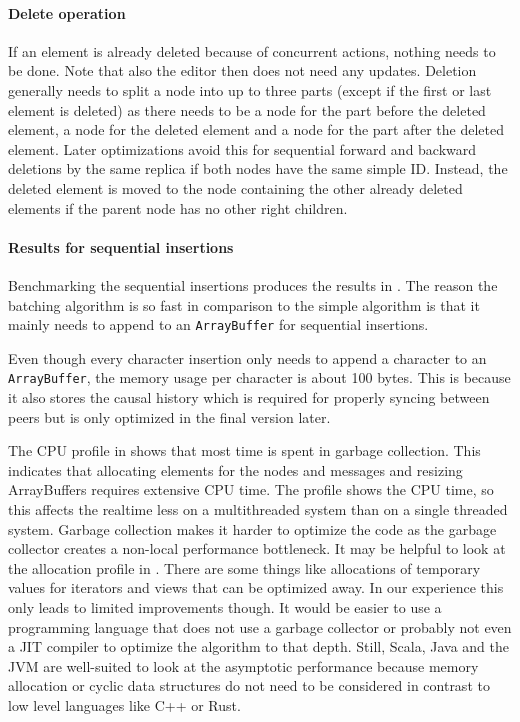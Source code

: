 \paragraph{Delete operation}

If an element is already deleted because of concurrent actions, nothing needs to be done. Note that also the editor then does not need any updates. Deletion generally needs to split a node into up to three parts (except if the first or last element is deleted) as there needs to be a node for the part before the deleted element, a node for the deleted element and a node for the part after the deleted element. Later optimizations avoid this for sequential forward and backward deletions by the same replica if both nodes have the same \gls{simple ID}. Instead, the deleted element is moved to the node containing the other already deleted elements if the parent node has no other right children.


\paragraph{Results for sequential insertions}

Benchmarking the sequential insertions produces the results in . The reason the \gls{batching algorithm} is so fast in comparison to the \gls{simple algorithm} is that it mainly needs to append to an \texttt{ArrayBuffer} for sequential insertions.

Even though every character insertion only needs to append a character to an \texttt{ArrayBuffer}, the memory usage per character is about 100 bytes. This is because it also stores the causal history which is required for properly syncing between peers but is only optimized in the final version later.

The CPU profile in  shows that most time is spent in garbage collection. This indicates that allocating elements for the nodes and messages and resizing ArrayBuffers requires extensive CPU time. The profile shows the CPU time, so this affects the realtime less on a multithreaded system than on a single threaded system. Garbage collection makes it harder to optimize the code as the garbage collector creates a non-local performance bottleneck. It may be helpful to look at the allocation profile in .
There are some things like allocations of temporary values for iterators and views that can be optimized away. In our experience this only leads to limited improvements though. It would be easier to use a programming language that does not use a garbage collector or probably not even a JIT compiler to optimize the algorithm to that depth. Still, Scala, Java and the JVM are well-suited to look at the asymptotic performance because memory allocation or cyclic data structures do not need to be considered in contrast to low level languages like C++ or Rust.


